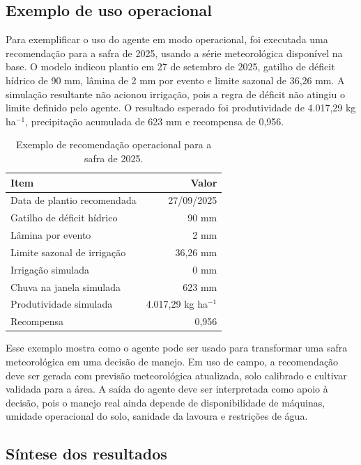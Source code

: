 \subsection{Exemplo de uso operacional}
\label{subsec:exemplo_uso}

Para exemplificar o uso do agente em modo operacional, foi executada uma
recomendação para a safra de 2025, usando a série meteorológica disponível na
base. O modelo indicou plantio em 27 de setembro de 2025, gatilho de déficit
hídrico de 90 mm, lâmina de 2 mm por evento e limite sazonal de 36,26 mm. A
simulação resultante não acionou irrigação, pois a regra de déficit não atingiu
o limite definido pelo agente. O resultado esperado foi produtividade de
4.017,29 kg ha$^{-1}$, precipitação acumulada de 623 mm e recompensa de 0,956.

\begin{table}[htbp]
\centering
\caption{Exemplo de recomendação operacional para a safra de 2025.}
\label{tab:exemplo_operacional}
\begin{tabular}{lr}
\hline
Item & Valor \\
\hline
Data de plantio recomendada & 27/09/2025 \\
Gatilho de déficit hídrico & 90 mm \\
Lâmina por evento & 2 mm \\
Limite sazonal de irrigação & 36,26 mm \\
Irrigação simulada & 0 mm \\
Chuva na janela simulada & 623 mm \\
Produtividade simulada & 4.017,29 kg ha$^{-1}$ \\
Recompensa & 0,956 \\
\hline
\end{tabular}
\end{table}

Esse exemplo mostra como o agente pode ser usado para transformar uma safra
meteorológica em uma decisão de manejo. Em uso de campo, a recomendação deve ser
gerada com previsão meteorológica atualizada, solo calibrado e cultivar validada
para a área. A saída do agente deve ser interpretada como apoio à decisão, pois
o manejo real ainda depende de disponibilidade de máquinas, umidade operacional
do solo, sanidade da lavoura e restrições de água.

\subsection{Síntese dos resultados}
\label{subsec:sintese_resultados}

